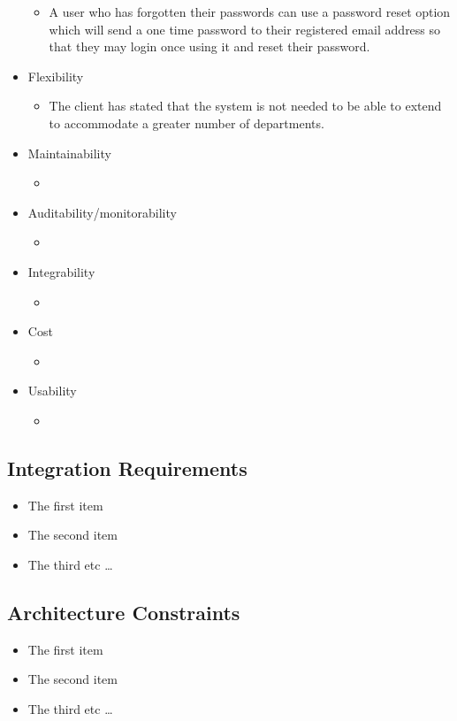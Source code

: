 \documentclass{article}
\begin{document}
\begin{itemize}
\begin{itemize}
					\item A user who has forgotten their passwords can use a password reset option which will send a one time password to their registered email address so that they may login once using it and reset their password.
				\end{itemize}
				\item Flexibility
				\begin{itemize}
					\item The client has stated that the system is not needed to be able to extend to accommodate a greater number of departments.
				\end{itemize}
				\item Maintainability
				\begin{itemize}
					\item
				\end{itemize}
				\item Auditability/monitorability
				\begin{itemize}
					\item
				\end{itemize}
				\item Integrability
				\begin{itemize}
					\item
				\end{itemize}
				\item Cost
				\begin{itemize}
					\item
				\end{itemize}
				\item Usability
				\begin{itemize}
					\item
				\end{itemize}
			\end{itemize}
		
		\subsection{Integration Requirements}\label{subsec:integration}
			\begin{itemize}
			  	\item The first item
			  	\item The second item
			  	\item The third etc \ldots
			\end{itemize}
		
		\subsection{Architecture Constraints}\label{subsec:constraints}
			\begin{itemize}
			  \item The first item
			  \item The second item
			  \item The third etc \ldots
			\end{itemize}
		
\end{document}
